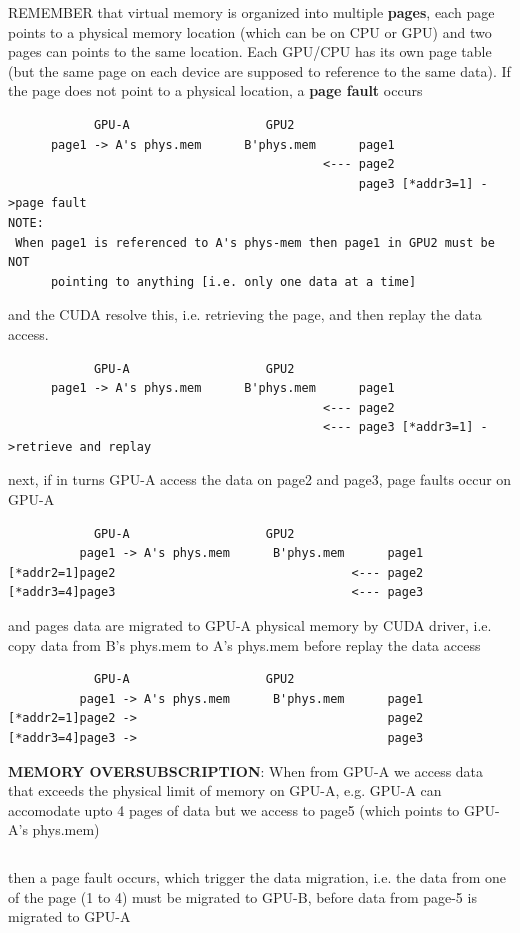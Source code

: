 REMEMBER that virtual memory is organized into multiple {\bf pages}, each page
points to a physical memory location (which can be on CPU or GPU) and two pages
can points to the same location. Each GPU/CPU has its own page table (but the
same page on each device are supposed to reference to the same data).
If the page does not point to a physical location, a {\bf page fault} occurs
\begin{verbatim}
            GPU-A                   GPU2
      page1 -> A's phys.mem      B'phys.mem      page1
                                            <--- page2 
                                                 page3 [*addr3=1] ->page fault
NOTE:
 When page1 is referenced to A's phys-mem then page1 in GPU2 must be NOT
      pointing to anything [i.e. only one data at a time]
\end{verbatim}
and the CUDA resolve this, i.e. retrieving the page, and then replay the data
access.
\begin{verbatim}
            GPU-A                   GPU2
      page1 -> A's phys.mem      B'phys.mem      page1
                                            <--- page2 
                                            <--- page3 [*addr3=1] ->retrieve and replay
\end{verbatim}
next, if in turns GPU-A access the data on page2 and page3, page faults occur on GPU-A
\begin{verbatim}
            GPU-A                   GPU2
          page1 -> A's phys.mem      B'phys.mem      page1
[*addr2=1]page2                                 <--- page2 
[*addr3=4]page3                                 <--- page3
\end{verbatim}
and pages data are migrated to GPU-A physical memory by CUDA driver, i.e.
 copy data from B's phys.mem to A's phys.mem before replay the data access
\begin{verbatim}
            GPU-A                   GPU2
          page1 -> A's phys.mem      B'phys.mem      page1
[*addr2=1]page2 ->                                   page2 
[*addr3=4]page3 ->                                   page3 
\end{verbatim}

{\bf MEMORY OVERSUBSCRIPTION}: When from GPU-A we access data that exceeds the
physical limit of memory on GPU-A, e.g. GPU-A can accomodate upto 4 pages of data
but we access to page5 (which points to GPU-A's phys.mem)
\begin{verbatim}

\end{verbatim}
then a page fault occurs, which trigger the data migration, i.e.
the data from one of the page (1 to 4) must be migrated to GPU-B, before data
from page-5 is migrated to GPU-A

